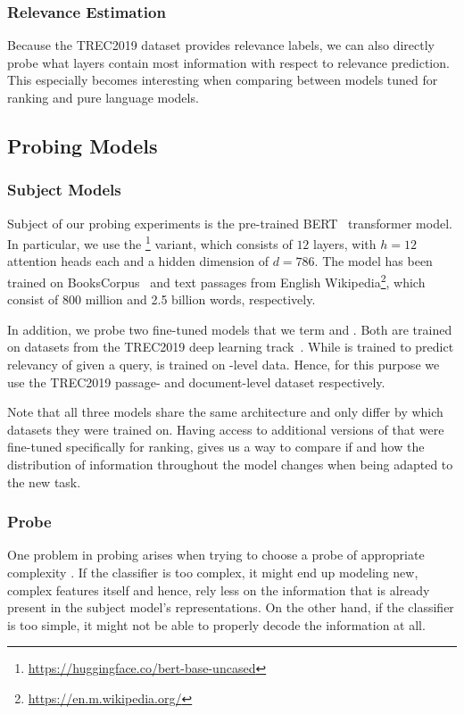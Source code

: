 \subsubsection{Relevance Estimation}
Because the TREC2019 dataset provides relevance labels, we can also directly probe what layers contain most information with respect to relevance prediction. This especially becomes interesting when comparing between models tuned for ranking and pure language models.

\subsection{Probing Models}
\subsubsection{Subject Models}
\label{sec:subjects}
Subject of our probing experiments is the pre-trained BERT~\cite{devlin-etal-2019-bert} transformer model. In particular, we use the \footnote{\url{https://huggingface.co/bert-base-uncased}} variant, which consists of $12$ layers, with $h=12$ attention heads each and a hidden dimension of $d=786$. The model has been trained on BooksCorpus~\cite{7410368} and text passages from English Wikipedia\footnote{\url{https://en.m.wikipedia.org/}}, which consist of 800 million and 2.5 billion words, respectively.

In addition, we probe two fine-tuned  models that we term  and . Both are trained on datasets from the TREC2019 deep learning track~\cite{DBLP:journals/corr/abs-2003-07820}. While  is trained to predict relevancy of  given a query,  is trained on -level data. Hence, for this purpose we use the TREC2019 passage- and document-level dataset respectively.

Note that all three models share the same architecture and only differ by which datasets they were trained on. Having access to additional versions of  that were fine-tuned specifically for ranking, gives us a way to compare if and how the distribution of information throughout the model changes when being adapted to the new task.

\subsubsection{Probe}
\label{sec:probe}
One problem in probing arises when trying to choose a probe of appropriate complexity \cite{hewitt-liang-2019-designing}. If the classifier is too complex, it might end up modeling new, complex features itself and hence, rely less on the information that is already present in the subject model's representations. On the other hand, if the classifier is too simple, it might not be able to properly decode the information at all.

